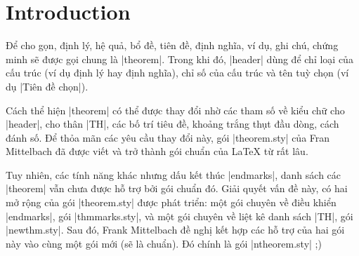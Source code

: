 \documentclass[11pt,oneside]{ltxdoc}
\theoremstyle{marginbreak}
\theoremstyle{changebreak}
\theoremstyle{change}
\theoremstyle{plain}
\theoremstyle{nonumberplain}
\begin{document}
\newpage

\tableofcontents


\section{Introduction}

Để cho gọn, định lý, hệ quả, bổ đề, tiên đề,
định nghĩa, ví dụ, ghi chú, chứng minh sẽ được gọi chung là |theorem|.
Trong khi đó, |header| dùng để chỉ loại của cấu trúc (ví dụ định lý hay
định nghĩa), chỉ số của cấu trúc và tên tuỳ chọn (ví dụ |Tiên đề chọn|).

\medskip
Cách thể hiện |theorem| có thể được thay đổi nhờ các tham số về
kiểu chữ cho |header|, cho thân |TH|, các bố trí tiêu đề, khoảng trắng
thụt đầu dòng, cách đánh số. Để thỏa mãn các yêu cầu thay đổi này,
gói |theorem.sty| của Fran Mittelbach đã được viết và trở thành
gói chuẩn của \LaTeX{} từ rất lâu.

\medskip
Tuy nhiên, các tính năng khác nhưng dấu kết thúc |endmarks|, danh sách
các |theorem| vẫn chưa được hỗ trợ bởi gói chuẩn đó. Giải quyết vấn đề này,
có hai mở rộng của gói |theorem.sty| được phát triển: một gói chuyên về
điều khiển |endmarks|, gói |thmmarks.sty|, và một gói chuyên về liệt
kê danh sách |TH|, gói |newthm.sty|. Sau đó, Frank Mittelbach đề nghị
kết hợp các hỗ trợ của hai gói này vào cùng một gói mới (sẽ là chuẩn).
Đó chính là gói |ntheorem.sty| ;)
\end{document}
